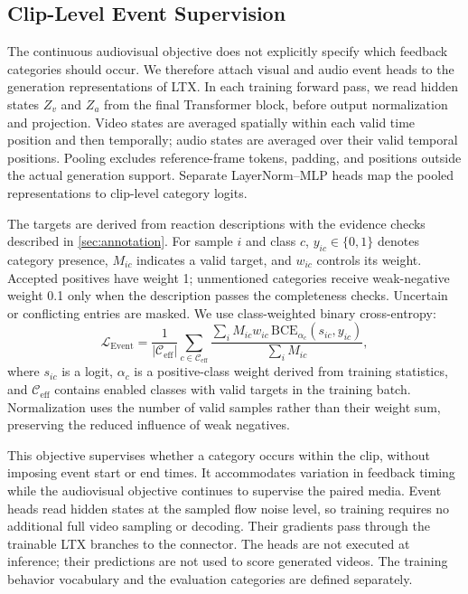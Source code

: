 \subsection{Clip-Level Event Supervision}
\label{sec:event}
The continuous audiovisual objective does not explicitly specify which
feedback categories should occur. We therefore attach visual and audio
event heads to the generation representations of LTX. In each training
forward pass, we read hidden states $Z_v$ and $Z_a$ from the final
Transformer block, before output normalization and projection. Video
states are averaged spatially within each valid time position and then
temporally; audio states are averaged over their valid temporal positions.
Pooling excludes reference-frame tokens, padding, and positions outside
the actual generation support. Separate LayerNorm--MLP heads map the
pooled representations to clip-level category logits.

The targets are derived from reaction descriptions with the evidence
checks described in \cref{sec:annotation}. For sample $i$ and class $c$,
$y_{ic}\in\{0,1\}$ denotes category presence, $M_{ic}$ indicates a valid
target, and $w_{ic}$ controls its weight. Accepted positives have weight
1; unmentioned categories receive weak-negative weight 0.1 only when
the description passes the completeness checks. Uncertain or conflicting
entries are masked. We use class-weighted binary cross-entropy:
\begin{equation}
 \mathcal L_{\mathrm{Event}}=
 \frac{1}{|\mathcal C_{\mathrm{eff}}|}
 \sum_{c\in\mathcal C_{\mathrm{eff}}}
 \frac{\sum_i M_{ic}w_{ic}\,
       \mathrm{BCE}_{\alpha_c}(s_{ic},y_{ic})}
      {\sum_i M_{ic}},
\label{eq:event}
\end{equation}
where $s_{ic}$ is a logit, $\alpha_c$ is a positive-class weight derived
from training statistics, and $\mathcal C_{\mathrm{eff}}$ contains enabled
classes with valid targets in the training batch. Normalization uses the
number of valid samples rather than their weight sum, preserving the
reduced influence of weak negatives.

This objective supervises whether a category occurs within the clip,
without imposing event start or end times. It accommodates variation in
feedback timing while the audiovisual objective continues to supervise
the paired media. Event heads read hidden states at the sampled
flow noise level, so training requires no additional full video sampling
or decoding. Their gradients pass through the trainable LTX branches to
the connector. The heads are not executed at inference; their predictions
are not used to score generated videos. The training behavior vocabulary
and the evaluation categories are defined separately.

